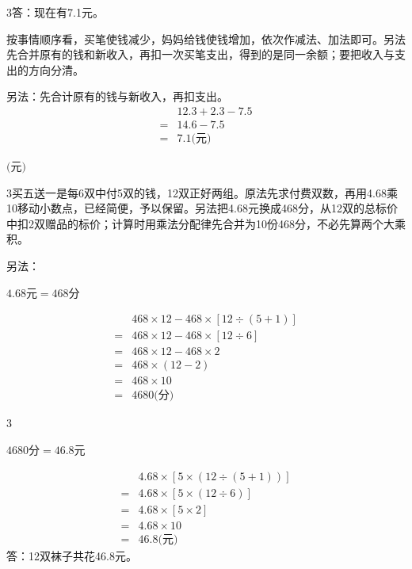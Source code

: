 \documentclass[multi=snippet,border={5bp 20bp 5bp 5bp}]{standalone}
\newenvironment{snippet}[3]{\begin{minipage}{#1bp}\color{answerred}\fontsize{#2}{#3}\selectfont\raggedright}{\end{minipage}}
\begin{document}
\begin{snippet}{505}{11.5}{14}\begin{multicols}{3}\raggedcolumns 答：现在有7.1元。\par 按事情顺序看，买笔使钱减少，妈妈给钱使钱增加，依次作减法、加法即可。另法先合并原有的钱和新收入，再扣一次买笔支出，得到的是同一余额；要把收入与支出的方向分清。\par 另法：先合计原有的钱与新收入，再扣支出。\[\begin{aligned} &12.3+2.3-7.5\\={}&14.6-7.5\\={}&7.1\text{(元)}\end{aligned}\]\end{multicols}\end{snippet}
\begin{snippet}{80}{9.5}{14}\SourceSans\setlength{\mathindent}{2bp}\(\text{(元)}\)\end{snippet}
\begin{snippet}{505}{11.5}{14}\begin{multicols}{3}\raggedcolumns 买五送一是每6双中付5双的钱，12双正好两组。原法先求付费双数，再用4.68乘10移动小数点，已经简便，予以保留。另法把4.68元换成468分，从12双的总标价中扣2双赠品的标价；计算时用乘法分配律先合并为10份468分，不必先算两个大乘积。\par 另法：\par\noindent\(\displaystyle 4.68\text{元}=468\text{分}\)\allowbreak \par \noindent\end{multicols}\[\displaystyle \begin{aligned}&468\times12-468\times[12\div(5+1)]\\={}&468\times12-468\times[12\div6]\\={}&468\times12-468\times2\\={}&468\times(12-2)\\={}&468\times10\\={}&4680\text{(分)}\end{aligned}\]\begin{multicols}{3}\raggedcolumns \par \noindent\(\displaystyle 4680\text{分}=46.8\text{元}\)\allowbreak \par\end{multicols}\end{snippet}
\begin{snippet}{242}{10.5}{12.8}\SourceSans\setlength{\mathindent}{2bp}\[\begin{aligned}&4.68\times[5\times(12\div(5+1))]\\={}&4.68\times[5\times(12\div6)]\\={}&4.68\times[5\times2]\\={}&4.68\times10\\={}&46.8\text{(元)}\end{aligned}\]答：12双袜子共花46.8元。\end{snippet}
\end{document}
